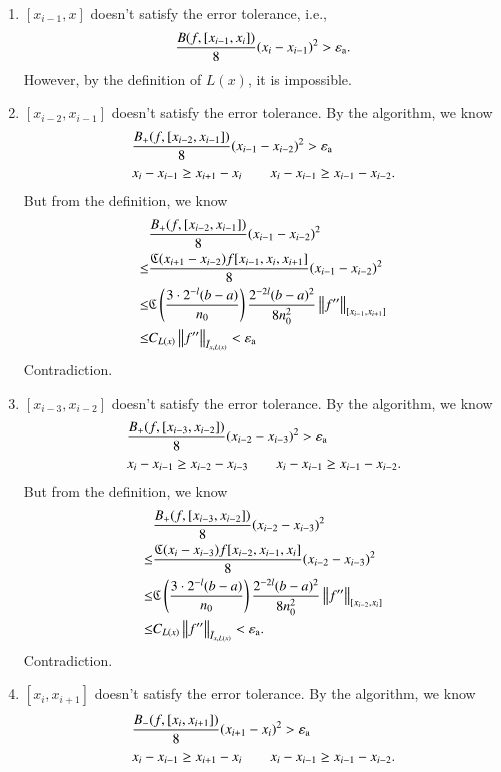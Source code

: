 \begin{enumerate}
  \item $[x_{i-1},x]$ doesn't satisfy the error tolerance, i.e.,
  $$\frac{B(f,[x_{i-1},x_i])}{8}(x_i-x_{i-1})^2 > \abstol.$$
  However, by the definition of $L(x)$, it is impossible.
  \item $[x_{i-2},x_{i-1}]$ doesn't satisfy the error tolerance.  By the algorithm, we know
  \begin{align*}&\frac{B_+(f,[x_{i-2},x_{i-1}])}{8}(x_{i-1}-x_{i-2})^2 > \abstol\\
  &x_i-x_{i-1} \ge  x_{i+1}-x_{i} \qquad x_i-x_{i-1} \ge x_{i-1}-x_{i-2}.
  \end{align*}
  But from the definition, we know
  \begin{align*}
  & \frac{B_+(f,[x_{i-2},x_{i-1}])}{8}(x_{i-1}-x_{i-2})^2 \\ \le &\frac{\fC(x_{i+1}-x_{i-2})f[x_{i-1},x_{i},x_{i+1}]}{8}(x_{i-1}-x_{i-2})^2\\
    \le & \fC\left(\frac{3\cdot2^{-l}(b-a)}{n_0}\right) \frac{2^{-2l}(b-a)^2}{8n^2_0}\norm[{[x_{i-1},x_{i+1}]}]{f''} \\
     \le & C_{L(x)} \norm[\bar{I}_{x,L(x)}]{f''} < \abstol
  \end{align*}
  Contradiction.
  \item $[x_{i-3},x_{i-2}]$ doesn't satisfy the error tolerance. By the algorithm, we know
  \begin{align*}
  & \frac{B_+(f,[x_{i-3},x_{i-2}])}{8}(x_{i-2}-x_{i-3})^2 > \abstol \\&x_i-x_{i-1} \ge x_{i-2}-x_{i-3} \qquad x_i-x_{i-1} \ge x_{i-1}-x_{i-2}.
  \end{align*}
  But from the definition, we know
  \begin{align*}
  & \frac{B_+(f,[x_{i-3},x_{i-2}])}{8}(x_{i-2}-x_{i-3})^2 \\  \le &\frac{\fC(x_i-x_{i-3})f[x_{i-2},x_{i-1},x_{i}]}{8}(x_{i-2}-x_{i-3})^2\\
    \le & \fC\left(\frac{3\cdot2^{-l}(b-a)}{n_0}\right) \frac{2^{-2l}(b-a)^2}{8n^2_0}\norm[{[x_{i-2},x_{i}]}]{f''} \\
     \le & C_{L(x)} \norm[\bar{I}_{x,L(x)}]{f''}< \abstol.
  \end{align*}
  Contradiction.
  \item $[x_{i},x_{i+1}]$ doesn't satisfy the error tolerance. By the algorithm, we know
  \begin{align*}& \frac{B_-(f,[x_{i},x_{i+1}])}{8}(x_{i+1}-x_{i})^2 > \abstol \\ & x_i-x_{i-1} \ge x_{i+1}-x_{i} \qquad x_i-x_{i-1} \ge x_{i-1}-x_{i-2}.\end{align*}

\end{enumerate}
